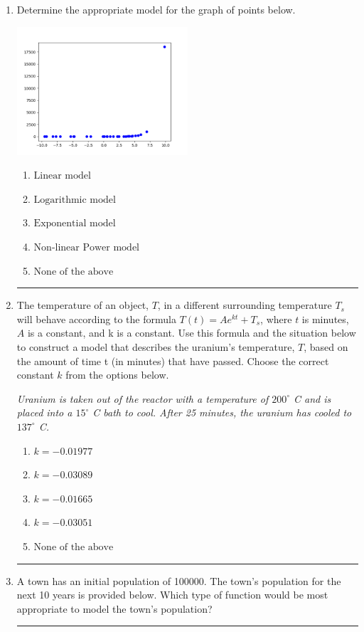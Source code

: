 \documentclass[14pt]{extbook}
\newcommand{\litem}[1]{\item#1\hspace*{-1cm}\rule{\textwidth}{0.4pt}}
\begin{document}
\begin{enumerate}
{\begin{enumerate}[label=\Alph*.]
\end{enumerate} }
\litem{
Determine the appropriate model for the graph of points below.
\begin{center}
    \includegraphics[width=0.5\textwidth]{../Figures/identifyModelGraph11B.png}
\end{center}
\begin{enumerate}[label=\Alph*.]
\item \( \text{Linear model} \)
\item \( \text{Logarithmic model} \)
\item \( \text{Exponential model} \)
\item \( \text{Non-linear Power model} \)
\item \( \text{None of the above} \)

\end{enumerate} }
\litem{
The temperature of an object, $T$, in a different surrounding temperature $T_s$ will behave according to the formula $T(t) = Ae^{kt} + T_s$, where $t$ is minutes, $A$ is a constant, and k is a constant. Use this formula and the situation below to construct a model that describes the uranium's temperature, $T$, based on the amount of time t (in minutes) that have passed. Choose the correct constant $k$ from the options below.
\begin{center}
    \textit{ Uranium is taken out of the reactor with a temperature of $200^{\circ}$ C and is placed into a $15^{\circ}$ C bath to cool. After 25 minutes, the uranium has cooled to $137^{\circ}$ C. }
\end{center}
\begin{enumerate}[label=\Alph*.]
\item \( k = -0.01977 \)
\item \( k = -0.03089 \)
\item \( k = -0.01665 \)
\item \( k = -0.03051 \)
\item \( \text{None of the above} \)

\end{enumerate} }
\litem{
A town has an initial population of 100000. The town's population for the next 10 years is provided below. Which type of function would be most appropriate to model the town's population?


}
\end{enumerate}
\end{document}
